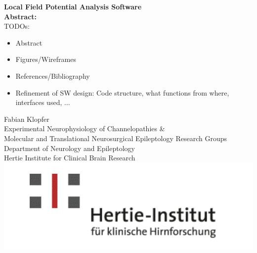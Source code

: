 \documentclass[a4paper]{article}
\begin{document}
\begin{titlepage}
\thispagestyle{plain}
   \begin{center}
       \vspace*{1cm}
        \Huge
       \textbf{Local Field Potential Analysis Software} \vspace*{3em} \\
       \normalsize
               \textbf{Abstract: \\}
        TODOs:
        \begin{itemize}
        \item Abstract
         \item Figures/Wireframes
         \item References/Bibliography
         \item Refinement of SW design: Code structure, what functions from where, interfaces used, $\dots$
        \end{itemize}
        
        
        \vfill
       
       
       Fabian Klopfer \vspace{1em}\\
       Experimental Neurophysiology of Channelopathies \& \\ Molecular and Translational Neurosurgical Epileptology Research Groups \vspace{1em} \\
       Department of Neurology and Epileptology \vspace{1em} \\
       Hertie Institute for Clinical Brain Research \vspace{1cm} \\
       \includegraphics[keepaspectratio, height=0.1\textheight]{img/logo.png}
        \vspace*{1cm}
        
   \end{center}
\end{titlepage}

\tableofcontents
\end{document}
